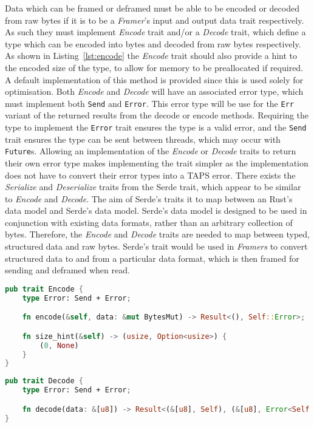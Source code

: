 \documentclass{l4proj}
\begin{document}
Data which can be framed or deframed must be able to be encoded or decoded from raw bytes if it is to be a
\emph{Framer}'s input and output data trait respectively.
As such they must implement \emph{Encode} trait and/or a \emph{Decode} trait, which define a type which can be encoded
into bytes and decoded from raw bytes respectively.
As shown in Listing~\ref{lst:encode} the \emph{Encode} trait should also provide a hint to the encoded size of the type,
to allow for memory to be preallocated if required.
A default implementation of this method is provided since this is used solely for optimisation.
Both \emph{Encode} and \emph{Decode} will have an associated error type, which must implement both \texttt{Send} and
\texttt{Error}.
This error type will be use for the \texttt{Err} variant of the returned results from the decode or encode methods.
Requiring the type to implement the \texttt{Error} trait ensures the type is a valid error, and the \texttt{Send} trait
ensures the type can be sent between threads, which may occur with \texttt{Future}s.
Allowing an implementation of the \emph{Encode} or \emph{Decode} traits to return their own error type makes
implementing the trait simpler as the implementation does not have to convert their error types into a TAPS error.
There exists the \emph{Serialize} and \emph{Deserialize} traits from the Serde trait, which appear to be similar to
\emph{Encode} and \emph{Decode}.
The aim of Serde's traits it to map between an Rust's data model and Serde's data model.
Serde's data model is designed to be used in conjunction with existing data formats, rather than an arbitrary collection
of bytes.
Therefore, the \emph{Encode} and \emph{Decode} traits are needed to map between typed, structured data and raw bytes.
Serde's trait would be used in \emph{Framers} to convert structured data to and from a particular data format, which is
then framed for sending and deframed when read.

\begin{lstlisting}[language=Rust, float=h, label=lst:encode, caption={The Encode trait, showing the size\_hint method.}]
pub trait Encode {
    type Error: Send + Error;

    fn encode(&self, data: &mut BytesMut) -> Result<(), Self::Error>;

    fn size_hint(&self) -> (usize, Option<usize>) {
        (0, None)
    }
}
\end{lstlisting}

\begin{lstlisting}[language=Rust, float=h, label=lst:decode, caption={The Decode trait.}]
pub trait Decode {
    type Error: Send + Error;

    fn decode(data: &[u8]) -> Result<(&[u8], Self), (&[u8], Error<Self::Error>)>;
}
\end{lstlisting}
\end{document}
